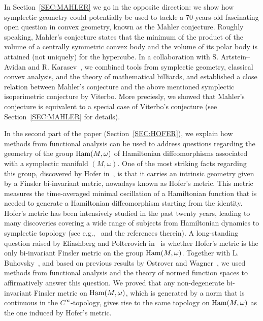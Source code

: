 \documentclass{icmart}
\theoremstyle{definition}
\begin{document}
In Section~\ref{SEC:MAHLER} we go in the opposite direction: we show how symplectic geometry could potentially be used to tackle  a 70-years-old fascinating open question
in convex geometry, %
known as the Mahler conjecture.
Roughly speaking, Mahler's conjecture states that the minimum of the product of the volume of a centrally symmetric convex body and the volume of its polar body is attained (not uniquely) for the hypercube. 
In a collaboration with S. Artstein--Avidan and R. Karasev~\cite{AKO}, we combined tools from symplectic geometry, classical convex analysis, and the theory of mathematical billiards,
and established a close relation between Mahler's conjecture and the above mentioned symplectic isoperimetric conjecture by Viterbo. More preciesly, we showed that Mahler's conjecture is equivalent to a special case of Viterbo's conjecture (see Section~\ref{SEC:MAHLER} for details). 



In the second part of the paper (Section~\ref{SEC:HOFER}),  we explain how methods from functional analysis can be used to address  questions regarding the 
 geometry of the group ${\rm Ham}(M, \omega)$ of Hamiltonian
diffeomorphisms   associated with a symplectic manifold $(M,\omega)$. 
One of the most striking facts regarding
this group, discovered by Hofer in~\cite{H}, is that it carries an intrinsic geometry given by a Finsler bi-invariant metric, nowadays 
known as Hofer's metric. This metric measures the time-averaged minimal oscillation of a
Hamiltonian function that is needed to generate a Hamiltonian diffeomorphism starting from the identity. %
Hofer's metric has been
intensively studied in the past twenty years, leading to many discoveries covering a wide
range of subjects from Hamiltonian dynamics to symplectic topology (see e.g.,~\cite{HZ, Mcd1,P1} and the references therein).
A long-standing question raised by Eliashberg and Polterovich in~\cite{EliP} is whether Hofer's metric is the only bi-invariant Finsler metric on the group ${\rm Ham}(M, \omega)$. %
Together with L. Buhovsky~\cite{BO}, and based on previous results by Ostrover and Wagner~\cite{OW}, we used methods from functional analysis and the theory of normed function spaces to  affirmatively answer this question. %
We proved that any non-degenerate bi-invariant Finsler metric on ${\rm Ham}(M, \omega)$, which is
generated by a norm that is continuous in the $C^{\infty}$-topology, gives rise to the same
topology on ${\rm Ham}(M, \omega)$ as the one induced by Hofer's metric.
\end{document}
